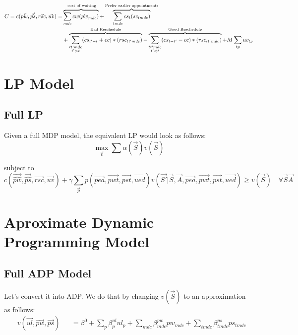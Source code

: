 \documentclass{article}
\begin{document}
\begin{equation}\begin{alignedat}{10}
	& C = c(\vec{\hat{pw}}, \vec{\hat{ps}}, \vec{rsc}, \vec{uv}) = 
		&& 
			\overbrace{ \sum_{mdc} cw (\hat{pw}_{mdc}) }^\text{
				cost of waiting}  + 
			\overbrace{
				\sum_{tmdc} cs_{t} (sc_{tmdc})
			}^\text{Prefer earlier appointments} \\ 
	&	&&  +
			\overbrace{
				\sum_{
				\substack{tt`mdc \\ t' > t}} 
				(cs_{t'-t} + cc) * (rsc_{tt'mdc})}^\text{Bad Reschedule} - 
			\overbrace{ 
				\sum_{
				\substack{tt`mdc \\ t' < t}}
				(cs_{t-t'} - cc) * (rsc_{tt'mdc})}^\text{Good Reschedule} + 
			M \sum_{tp} uv_{tp}
\end{alignedat}\end{equation}

\section{LP Model}

\subsection{Full LP} 
Given a full MDP model, the equivalent LP would look as follows:
\begin{equation}
	\max_{\vec{v}} \sum \alpha (\vec{S}) v(\vec{S}) 
\end{equation}

subject to
\begin{equation}
	c(\vec{\hat{pw}}, \vec{\hat{ps}}, \vec{rsc}, \vec{uv}) + \gamma \sum_{\vec{p}} p(\vec{pea}, \vec{pwt}, \vec{pst}, \vec{ued}) v( \vec{S'} | \vec{S}, \vec{A}, \vec{pea}, \vec{pwt}, \vec{pst}, \vec{ued}) \ge v(\vec{S}) \quad \forall \vec{S} \vec{A}
\end{equation}

\section{Aproximate Dynamic Programming Model}
\subsection{Full ADP Model}
Let's convert it into ADP. We do that by changing $v(\vec{S})$ to an approximation as follows:
\begin{equation}\begin{alignedat}{10}
	& v(\vec{ul}, \vec{pw}, \vec{ps}) 
		&& =  \beta^0 + \sum_{p} \beta_{p}^{ul} ul_{p} +
			\sum_{mdc} \beta_{mdc}^{pw} pw_{mdc}  + 
			\sum_{tmdc} \beta_{tmdc}^{ps} ps_{tmdc}
\end{alignedat} \end{equation}
\end{document}
